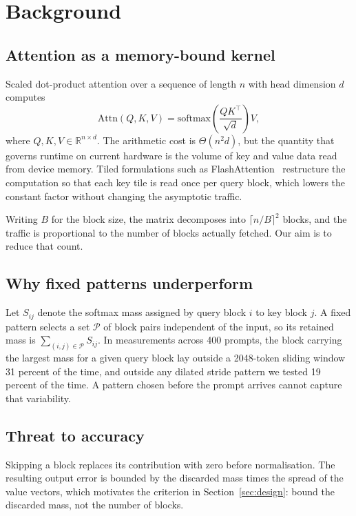 \section{Background}
\label{sec:background}

\subsection{Attention as a memory-bound kernel}

Scaled dot-product attention over a sequence of length $n$ with head dimension
$d$ computes
\begin{equation}
  \label{eq:attention}
  \mathrm{Attn}(Q, K, V) = \mathrm{softmax}\!\left(\frac{QK^{\top}}{\sqrt{d}}\right) V,
\end{equation}
where $Q, K, V \in \mathbb{R}^{n \times d}$. The arithmetic cost is
$\Theta(n^{2}d)$, but the quantity that governs runtime on current hardware is
the volume of key and value data read from device memory. Tiled formulations
such as FlashAttention~\cite{dao2022flashattention} restructure the computation
so that each key tile is read once per query block, which lowers the constant
factor without changing the asymptotic traffic.

Writing $B$ for the block size, the matrix decomposes into
$\lceil n/B \rceil^{2}$ blocks, and the traffic is proportional to the number of
blocks actually fetched. Our aim is to reduce that count.

\subsection{Why fixed patterns underperform}

Let $S_{ij}$ denote the softmax mass assigned by query block $i$ to key block
$j$. A fixed pattern selects a set $\mathcal{P}$ of block pairs independent of
the input, so its retained mass is $\sum_{(i,j) \in \mathcal{P}} S_{ij}$. In
measurements across 400 prompts, the block carrying the largest mass for a
given query block lay outside a 2048-token sliding window 31 percent of the
time, and outside any dilated stride pattern we tested 19 percent of the time.
A pattern chosen before the prompt arrives cannot capture that variability.

\subsection{Threat to accuracy}

Skipping a block replaces its contribution with zero before normalisation. The
resulting output error is bounded by the discarded mass times the spread of the
value vectors, which motivates the criterion in
Section~\ref{sec:design}: bound the discarded mass, not the number of blocks.
